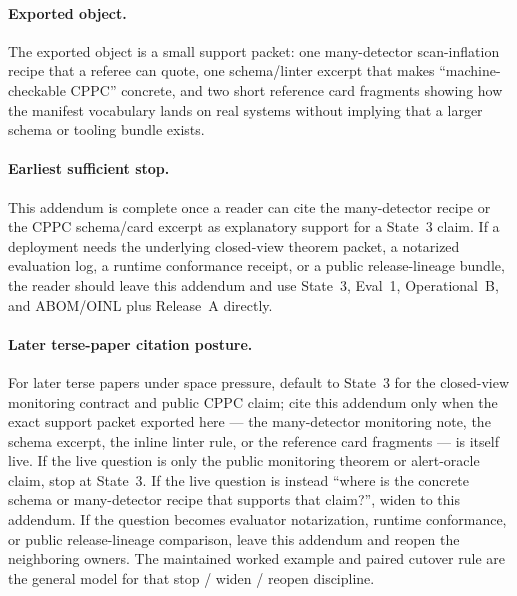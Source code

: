 \documentclass[11pt]{article}
\theoremstyle{definition}
\theoremstyle{remark}
\begin{document}
\paragraph{Exported object.}
The exported object is a small support packet: one many-detector scan-inflation recipe that a referee can quote, one schema/linter excerpt that makes ``machine-checkable CPPC'' concrete, and two short reference card fragments showing how the manifest vocabulary lands on real systems without implying that a larger schema or tooling bundle exists.

\paragraph{Earliest sufficient stop.}
This addendum is complete once a reader can cite the many-detector recipe or the CPPC schema/card excerpt as explanatory support for a State~3 claim.
If a deployment needs the underlying closed-view theorem packet, a notarized evaluation log, a runtime conformance receipt, or a public release-lineage bundle, the reader should leave this addendum and use State~3, Eval~1, Operational~B, and ABOM/OINL plus Release~A directly.\cite{series:state3,series:evalnotary,series:opB,series:abomoinl,series:releaseproperty}

\paragraph{Later terse-paper citation posture.}
For later terse papers under space pressure, default to State~3 for the closed-view monitoring contract and public CPPC claim; cite this addendum only when the exact support packet exported here --- the many-detector monitoring note, the schema excerpt, the inline linter rule, or the reference card fragments --- is itself live.
If the live question is only the public monitoring theorem or alert-oracle claim, stop at State~3.
If the live question is instead ``where is the concrete schema or many-detector recipe that supports that claim?'', widen to this addendum.
If the question becomes evaluator notarization, runtime conformance, or public release-lineage comparison, leave this addendum and reopen the neighboring owners.
The maintained worked example and paired cutover rule are the general model for that stop / widen / reopen discipline.\cite{series:workedexample,series:pairedterminalcutoverrules}
\end{document}
